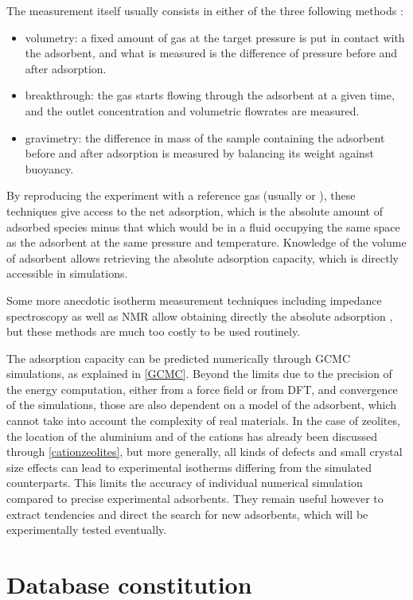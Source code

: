 \documentclass[main.tex]{subfiles}
\begin{document}
The measurement itself usually consists in either of the three following methods \autocite{BrandaniIsotherms2016}:
\begin{itemize}
	\item volumetry: a fixed amount of gas at the target pressure is put in contact with the adsorbent, and what is measured is the difference of pressure before and after adsorption.
	\item breakthrough: the gas starts flowing through the adsorbent at a given time, and the outlet concentration and volumetric flowrates are measured.
	\item gravimetry: the difference in mass of the sample containing the adsorbent before and after adsorption is measured by balancing its weight against buoyancy.
\end{itemize}
By reproducing the experiment with a reference gas (usually  or ), these techniques give access to the net adsorption, which is the absolute amount of adsorbed species minus that which would be in a fluid occupying the same space as the adsorbent at the same pressure and temperature. Knowledge of the volume of adsorbent allows retrieving the absolute adsorption capacity, which is directly accessible in simulations.

Some more anecdotic isotherm measurement techniques including impedance spectroscopy as well as NMR allow obtaining directly the absolute adsorption \autocite{BrandaniIsotherms2016}, but these methods are much too costly to be used routinely.

The adsorption capacity can be predicted numerically through GCMC simulations, as explained in \cref{GCMC}. Beyond the limits due to the precision of the energy computation, either from a force field or from DFT, and convergence of the simulations, those are also dependent on a model of the adsorbent, which cannot take into account the complexity of real materials. In the case of zeolites, the location of the aluminium and of the cations has already been discussed through \cref{cationzeolites}, but more generally, all kinds of defects and small crystal size effects can lead to experimental isotherms differing from the simulated counterparts. This limits the accuracy of individual numerical simulation compared to precise experimental adsorbents. They remain useful however to extract tendencies and direct the search for new adsorbents, which will be experimentally tested eventually.

\section{Database constitution}
\end{document}
